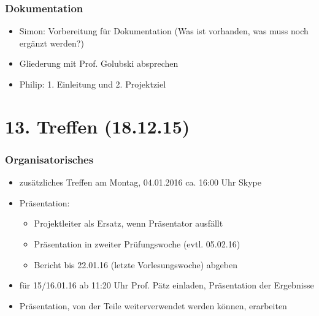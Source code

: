 \subsubsection{Dokumentation}

\begin{itemize}
	\item Simon: Vorbereitung für Dokumentation (Was ist vorhanden, was muss noch ergänzt werden?)
	\item Gliederung mit Prof. Golubski absprechen
	\item Philip: 1. Einleitung und 2. Projektziel
\end{itemize}


\section{13. Treffen (18.12.15)}
\subsubsection{Organisatorisches}
\begin{itemize}
	\item zusätzliches Treffen am Montag, 04.01.2016 ca. 16:00 Uhr Skype
	\item Präsentation:
	\begin{itemize}
		\item Projektleiter als Ersatz, wenn Präsentator ausfällt
		\item Präsentation in zweiter Prüfungswoche (evtl. 05.02.16)
		\item Bericht bis 22.01.16 (letzte Vorlesungswoche) abgeben
	\end{itemize}
	\item für 15/16.01.16 ab 11:20 Uhr Prof. Pätz einladen, Präsentation der Ergebnisse
	\item Präsentation, von der Teile weiterverwendet werden können, erarbeiten
\end{itemize}
